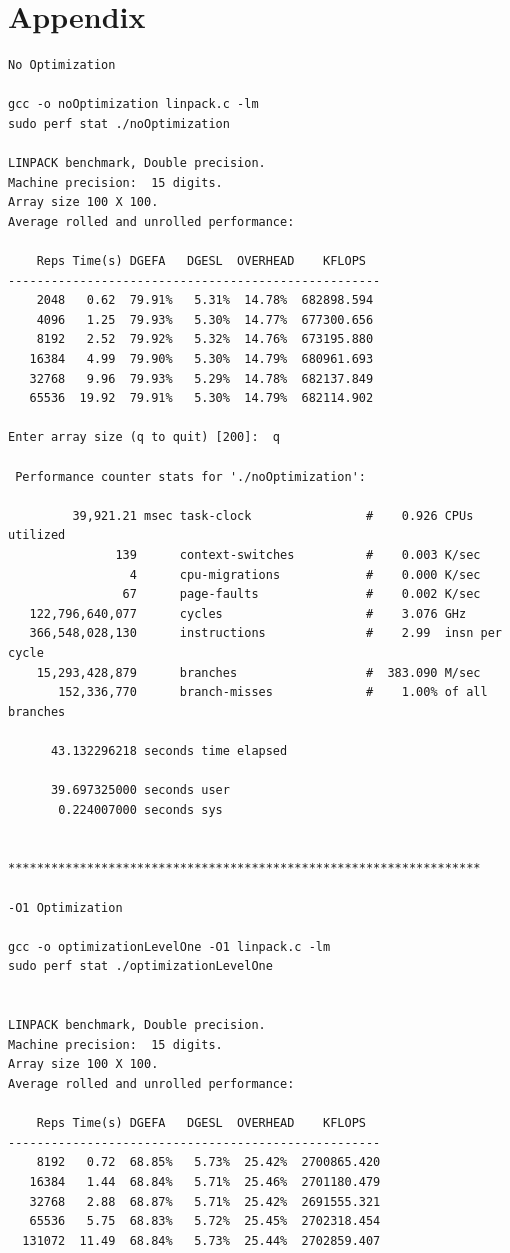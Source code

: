 \documentclass[twocolumn]{article}
\begin{document}
\section{Appendix}
\begin{verbatim}
No Optimization

gcc -o noOptimization linpack.c -lm
sudo perf stat ./noOptimization 

LINPACK benchmark, Double precision.
Machine precision:  15 digits.
Array size 100 X 100.
Average rolled and unrolled performance:

    Reps Time(s) DGEFA   DGESL  OVERHEAD    KFLOPS
----------------------------------------------------
    2048   0.62  79.91%   5.31%  14.78%  682898.594
    4096   1.25  79.93%   5.30%  14.77%  677300.656
    8192   2.52  79.92%   5.32%  14.76%  673195.880
   16384   4.99  79.90%   5.30%  14.79%  680961.693
   32768   9.96  79.93%   5.29%  14.78%  682137.849
   65536  19.92  79.91%   5.30%  14.79%  682114.902

Enter array size (q to quit) [200]:  q

 Performance counter stats for './noOptimization':

         39,921.21 msec task-clock                #    0.926 CPUs utilized          
               139      context-switches          #    0.003 K/sec                  
                 4      cpu-migrations            #    0.000 K/sec                  
                67      page-faults               #    0.002 K/sec                  
   122,796,640,077      cycles                    #    3.076 GHz                    
   366,548,028,130      instructions              #    2.99  insn per cycle         
    15,293,428,879      branches                  #  383.090 M/sec                  
       152,336,770      branch-misses             #    1.00% of all branches        

      43.132296218 seconds time elapsed

      39.697325000 seconds user
       0.224007000 seconds sys


******************************************************************

-O1 Optimization 

gcc -o optimizationLevelOne -O1 linpack.c -lm
sudo perf stat ./optimizationLevelOne 


LINPACK benchmark, Double precision.
Machine precision:  15 digits.
Array size 100 X 100.
Average rolled and unrolled performance:

    Reps Time(s) DGEFA   DGESL  OVERHEAD    KFLOPS
----------------------------------------------------
    8192   0.72  68.85%   5.73%  25.42%  2700865.420
   16384   1.44  68.84%   5.71%  25.46%  2701180.479
   32768   2.88  68.87%   5.71%  25.42%  2691555.321
   65536   5.75  68.83%   5.72%  25.45%  2702318.454
  131072  11.49  68.84%   5.73%  25.44%  2702859.407


\end{verbatim}
\end{document}
